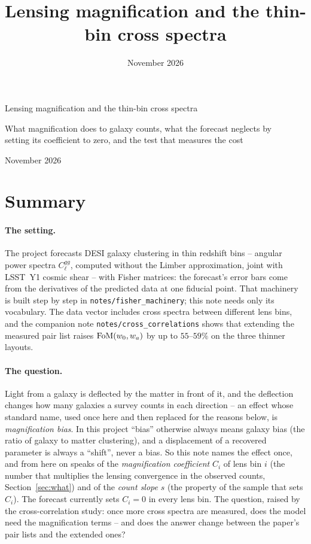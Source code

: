 \documentclass[11pt]{article}
\title{Lensing magnification and the thin-bin cross spectra}
\date{November 2026}
\author{}
\newcommand{\us}{\_\allowbreak}
\begin{document}
\begin{center}
  {\LARGE Lensing magnification and the thin-bin cross spectra\par}
  \vspace{0.4em}
  {\large What magnification does to galaxy counts, what the forecast
    neglects by\\ setting its coefficient to zero, and the test that
    measures the cost\par}
  \vspace{0.6em}
  {\large November 2026\par}
\end{center}
\vspace{1em}

\section{Summary}
\label{sec:summary}

\paragraph{The setting.}
The project forecasts DESI galaxy clustering in thin redshift bins --
angular power spectra $C_\ell^{gg}$, computed without the Limber
approximation, joint with LSST~Y1 cosmic shear -- with Fisher
matrices: the forecast's error bars come from the derivatives of the
predicted data at one fiducial point.  That machinery is built step by
step in \texttt{notes/fisher\us machinery}; this note needs only its
vocabulary.  The data vector includes cross spectra between different
lens bins, and the companion note \texttt{notes/cross\us correlations}
shows that extending the measured pair list raises
${\rm FoM}(w_0, w_a)$ by up to $55$--$59\%$ on the three thinner
layouts.

\paragraph{The question.}
Light from a galaxy is deflected by the matter in front of it, and the
deflection changes how many galaxies a survey counts in each direction
-- an effect whose standard name, used once here and then replaced for
the reasons below, is \emph{magnification bias}.  In this project
``bias'' otherwise always means galaxy bias (the ratio of galaxy to
matter clustering), and a displacement of a recovered parameter is
always a ``shift'', never a bias.  So this note names the effect once,
and from here on speaks of the \emph{magnification coefficient} $C_i$
of lens bin $i$ (the number that multiplies the lensing convergence in
the observed counts, Section~\ref{sec:what}) and of the \emph{count
slope} $s$ (the property of the sample that sets $C_i$).  The forecast
currently sets $C_i = 0$ in every lens bin.  The question, raised by
the cross-correlation study: once more cross spectra are measured, does
the model need the magnification terms -- and does the answer change
between the paper's pair lists and the extended ones?
\end{document}
